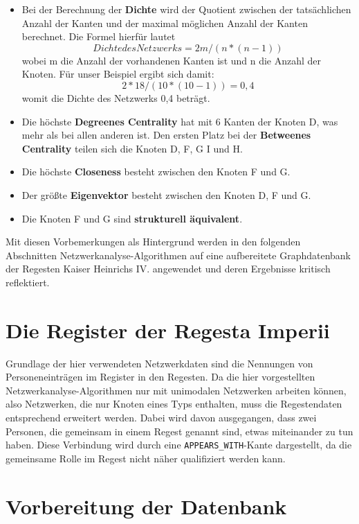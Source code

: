\documentclass[ngerman,]{scrreprt}
\begin{document}
\begin{itemize}
\item
  Bei der Berechnung der \textbf{Dichte} wird der Quotient zwischen der tatsächlichen Anzahl der Kanten und der maximal möglichen Anzahl der Kanten berechnet. Die Formel hierfür lautet \[Dichte des Netzwerks = 2m/(n*(n-1))\] wobei m die Anzahl der vorhandenen Kanten ist und n die Anzahl der Knoten. Für unser Beispiel ergibt sich damit: \[2*18/(10*(10-1)) = 0,4\] womit die Dichte des Netzwerks 0,4 beträgt.
\item
  Die höchste \textbf{Degreenes Centrality} hat mit 6 Kanten der Knoten D, was mehr als bei allen anderen ist. Den ersten Platz bei der \textbf{Betweenes Centrality} teilen sich die Knoten D, F, G I und H.
\item
  Die höchste \textbf{Closeness} besteht zwischen den Knoten F und G.
\item
  Der größte \textbf{Eigenvektor} besteht zwischen den Knoten D, F und G.
\item
  Die Knoten F und G sind \textbf{strukturell äquivalent}.
\end{itemize}

Mit diesen Vorbemerkungen als Hintergrund werden in den folgenden Abschnitten Netzwerkanalyse-Algorithmen auf eine aufbereitete Graphdatenbank der Regesten Kaiser Heinrichs IV. angewendet und deren Ergebnisse kritisch reflektiert.

\section{Die Register der Regesta Imperii}\label{die-register-der-regesta-imperii}

Grundlage der hier verwendeten Netzwerkdaten sind die Nennungen von Personeneinträgen im Register in den Regesten. Da die hier vorgestellten Netzwerkanalyse-Algorithmen nur mit unimodalen Netzwerken arbeiten können, also Netzwerken, die nur Knoten eines Typs enthalten, muss die Regestendaten entsprechend erweitert werden. Dabei wird davon ausgegangen, dass zwei Personen, die gemeinsam in einem Regest genannt sind, etwas miteinander zu tun haben. Diese Verbindung wird durch eine \texttt{APPEARS\_WITH}-Kante dargestellt, da die gemeinsame Rolle im Regest nicht näher qualifiziert werden kann.

\section{Vorbereitung der Datenbank}\label{vorbereitung-der-datenbank}
\end{document}
